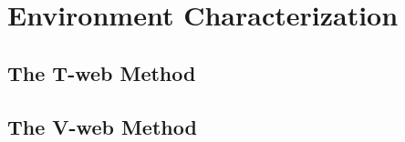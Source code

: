 



\section{Environment Characterization}
\label{sec:EnvironmentCharacterization}


	\subsection{The T-web Method}
	\label{subsec:TheT-webMethod}


	\subsection{The V-web Method}
	\label{subsec:TheV-webMethod}


